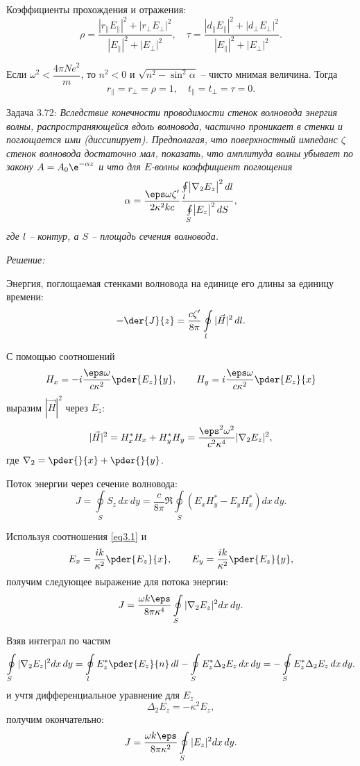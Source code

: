 Коэффициенты прохождения и отражения:
\[
    \rho = \frac{|r_\|E_\||^2 + |r_\perp E_\perp|^2}{|E_\||^2 + |E_\perp|^2},
    \quad \tau = \frac{|d_\|E_\||^2 + |d_\perp E_\perp|^2}{|E_\||^2 +
    |E_\perp|^2}.
\]

Если \( \omega^2 < \dfrac{4\pi Ne^2}{m} \), то \( n^2 < 0 \) и
\( \sqrt{n^2 - \sin^2\alpha} \) -- чисто мнимая величина. Тогда
\[
    r_\| = r_\perp = \rho = 1, \quad t_\| = t_\perp = \tau = 0.
\]

\newpage \reset
Задача 3.72: \emph{Вследствие конечности проводимости стенок волновода энергия
волны, распространяющейся вдоль волновода, частично проникает в стенки и
поглощается ими (диссипирует). Предполагая, что поверхностный импеданс
\( \zeta \) стенок волновода достаточно мал, показать, что амплитуда волны
убывает по закону \( A = A_0\e^{-\alpha z} \) и что для \( E \)-волны коэффициент
поглощения
\[
    \alpha = \frac{\eps\omega\zeta'}{2\kappa^2 kc} \frac{\oint\limits_l
    \bigr|\nabla_2 E_z\bigl|^2\,dl}{\oint\limits_S \bigr|E_z\bigl|^2\,dS},
\]
где \( l \) -- контур, а \( S \) -- площадь сечения волновода.}

\vspace*{2em}
\emph{Решение:}

Энергия, поглощаемая стенками волновода на единице его длины за единицу времени:
\[
    -\der{J}{z} = \frac{c\zeta'}{8\pi}\oint\limits_l |\vec{H}|^2\,dl.
\]

С помощью соотношений
\begin{equation}
    H_x = -i\frac{\eps\omega}{c\kappa^2}\pder{E_z}{y}, \qquad
    H_y = i\frac{\eps\omega}{c\kappa^2}\pder{E_z}{x}
    \label{eq3.1}
\end{equation}
выразим \( |\vec{H}|^2 \) через \( E_z \):
\[
    |\vec{H}|^2 = H_x^*H_x + H_y^*H_y = \frac{\eps^2\omega^2}{c^2\kappa^4}
    |\nabla_2E_z|^2,
\]
где \( \ds\nabla_2 = \pder{}{x} + \pder{}{y} \).

Поток энергии через сечение волновода:
\[
    J = \oint\limits_S S_z\,dx\,dy = \frac{c}{8\pi}\Re\oint\limits_S(E_xH_y^* -
    E_yH_x^*)dx\,dy.
\]

Используя соотношения \eqref{eq3.1} и
\[
    E_x = \frac{i k}{\kappa^2}\pder{E_z}{x}, \qquad
    E_y = \frac{i k}{\kappa^2}\pder{E_z}{y},
\]
получим следующее выражение для потока энергии:
\[
    J = \frac{\omega k\eps}{8\pi\kappa^4}\oint\limits_S |\nabla_2 E_z|^2dx\,dy.
\]

Взяв интеграл по частям
\[
    \oint\limits_S |\nabla_2 E_z|^2dx\,dy =
    \oint\limits_l E_z^*\pder{E_z}{n}\,dl -
    \oint\limits_S E_z^*\Delta_2 E_z\,dx\,dy =
    -\oint\limits_S E_z^*\Delta_2 E_z\,dx\,dy.
\]
и учтя дифференциальное уравнение для \( E_z \)
\[
    \Delta_2E_z = -\kappa^2E_z,
\]
получим окончательно:
\[
    J = \frac{\omega k\eps}{8\pi\kappa^2}\oint\limits_S |E_z|^2dx\,dy.
\]

